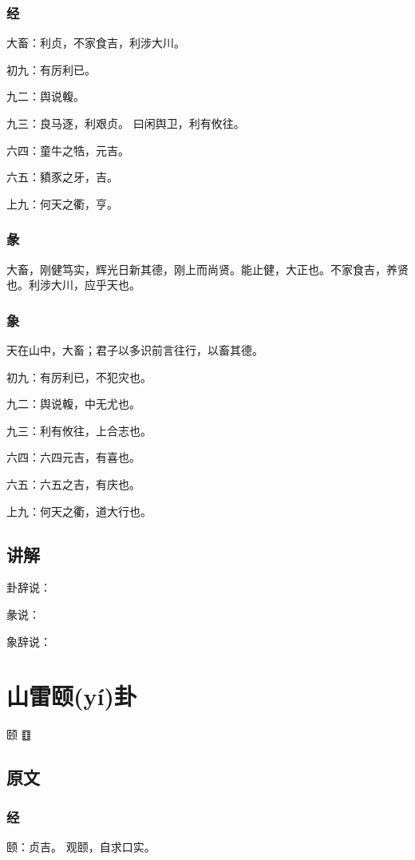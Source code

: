 \documentclass[12pt,oneside]{book}
\begin{document}
\subsection{经}
大畜：利贞，不家食吉，利涉大川。

初九：有厉利已。

九二：舆说輹。

九三：良马逐，利艰贞。 曰闲舆卫，利有攸往。

六四：童牛之牿，元吉。

六五：豶豕之牙，吉。

上九：何天之衢，亨。

\subsection{彖}
大畜，刚健笃实，辉光日新其德，刚上而尚贤。能止健，大正也。不家食吉，养贤也。利涉大川，应乎天也。

\subsection{象}
天在山中，大畜；君子以多识前言往行，以畜其德。

初九：有厉利已，不犯灾也。

九二：舆说輹，中无尤也。

九三：利有攸往，上合志也。

六四：六四元吉，有喜也。

六五：六五之吉，有庆也。

上九：何天之衢，道大行也。

\section{讲解}
卦辞说：

彖说：

象辞说：


\chapter{山雷颐(yí)卦}
颐 {\Large ䷚}

\section{原文}

\subsection{经}
颐：贞吉。 观颐，自求口实。
\end{document}
